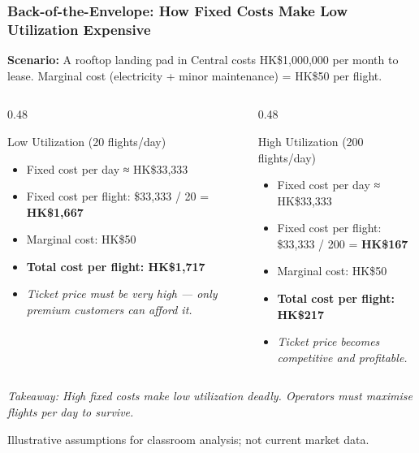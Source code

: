 \documentclass{beamer}
\begin{document}
\begin{frame}[t, shrink=10]
  \frametitle{Back-of-the-Envelope: How Fixed Costs Make Low Utilization Expensive}
 
  \textbf{Scenario:} A rooftop landing pad in Central costs HK\$1,000,000 per month to lease.  
  Marginal cost (electricity + minor maintenance) = HK\$50 per flight.
  \vspace{0.3cm}
  \begin{columns}[T]
    \begin{column}{0.48\textwidth}
      \begin{block}{Low Utilization (20 flights/day)}
      \begin{itemize}
          \item Fixed cost per day ≈ HK\$33,333
          \item Fixed cost per flight: \$33,333 / 20 = \textbf{HK\$1,667}
          \item Marginal cost: HK\$50
          \item \textbf{Total cost per flight: HK\$1,717}
          \item \textit{Ticket price must be very high — only premium customers can afford it.}
      \end{itemize}
      \end{block}
    \end{column}
    \begin{column}{0.48\textwidth}
      \begin{block}{High Utilization (200 flights/day)}
      \begin{itemize}
          \item Fixed cost per day ≈ HK\$33,333
          \item Fixed cost per flight: \$33,333 / 200 = \textbf{HK\$167}
          \item Marginal cost: HK\$50
          \item \textbf{Total cost per flight: HK\$217}
          \item \textit{Ticket price becomes competitive and profitable.}
      \end{itemize}
      \end{block}
    \end{column}
  \end{columns}
 
  \vspace{0.4cm}
  \textit{Takeaway: High fixed costs make low utilization deadly. Operators must maximise flights per day to survive.}

\vfill
{\tiny Illustrative assumptions for classroom analysis; not current market data.}
\end{frame}
\end{document}
